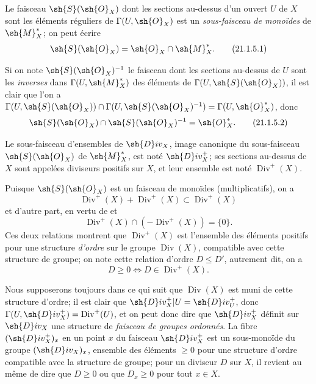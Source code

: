 \begin{env}[21.1.5]
\label{IV.21.1.5}
Le faisceau $\sh{S}(\sh{O}_X)$  dont les sections au-dessus d'un ouvert $U$ de $X$ sont les éléments réguliers de $\Gamma(U,\sh{O}_X)$ est un \emph{sous-faisceau de monoïdes} de $\sh{M}_X^*$; on peut écrire
\[
\label{IV.21.1.5.1}
  \sh{S}(\sh{O}_X)=\sh{O}_X\cap\sh{M}_X^*.
  \tag{21.1.5.1}
\]
\end{env}


Si on note $\sh{S}(\sh{O}_X)^{-1}$ le faisceau dont les sections au-dessus de $U$ sont les \emph{inverses} dans $\Gamma(U,\sh{M}_X^*)$ des éléments de $\Gamma(U,\sh{S}(\sh{O}_X))$, il est clair que l'on a $\Gamma(U,\sh{S}(\sh{O}_X))\cap\Gamma(U,\sh{S}(\sh{O}_X)^{-1})=\Gamma(U,\sh{O}_X^*)$, donc
\[
\label{IV.21.1.5.2}
  \sh{S}(\sh{O}_X)\cap\sh{S}(\sh{O}_X)^{-1}=\sh{O}_X^*.
  \tag{21.1.5.2}
\]

\begin{definition}[21.1.6]
Le sous-faisceau d'ensembles de $\sh{D}iv_X$, image canonique du sous-faisceau $\sh{S}(\sh{O}_X)$ de $\sh{M}_X^*$, est noté $\sh{D}iv_X^+$; ses sections au-dessus de $X$ sont appelées diviseurs positifs sur $X$, et leur ensemble est noté $\operatorname{Div}^+(X)$.
\end{definition}

Puisque $\sh{S}(\sh{O}_X)$ est un faisceau de monoïdes (multiplicatifs), on a
\[
\label{IV.21.1.6.1}
  \operatorname{Div}^+(X)+\operatorname{Div}^+(X)\subset\operatorname{Div}^+(X)
  \tag{21.1.6.1}
\]
et d'autre part, en vertu de  et 
\[
\label{IV.21.1.6.2}
  \operatorname{Div}^+(X)\cap(-\operatorname{Div}^+(X))=\{0\}.
  \tag{21.1.6.2}
\]
Ces deux relations montrent que $\operatorname{Div}^+(X)$ est l'ensemble des éléments positifs pour une structure \emph{d'ordre} sur le groupe $\operatorname{Div}(X)$, compatible avec cette structure de groupe; on note cette relation d'ordre $D\leq D'$, autrement dit, on a
\[
\label{IV.21.1.6.3}
  D\geq0 \iff D\in\operatorname{Div}^+(X).
  \tag{21.1.6.3}
\]

Nous supposerons toujours dans ce qui suit que $\operatorname{Div}(X)$ est muni de cette structure d'ordre;
il est clair que $\sh{D}iv_X^+|U=\sh{D}iv_U^+$, donc $\Gamma(U,\sh{D}iv_X^+)=\operatorname{Div}^+(U)$, et on peut donc dire que $\sh{D}iv_X^+$ définit sur $\sh{D}iv_X$ une structure de \emph{faisceau de groupes ordonnés}.
La fibre $(\sh{D}iv_X^+)_x$ en un point $x$ du faisceau $\sh{D}iv_X^+$ est un sous-monoïde du groupe $(\sh{D}iv_X)_x$, ensemble des éléments $\geq0$ pour une structure d'ordre compatible avec la structure de groupe;
pour un diviseur $D$ sur $X$, il revient au même de dire que $D\geq0$ ou que $D_x\geq0$ pour tout $x\in X$.

